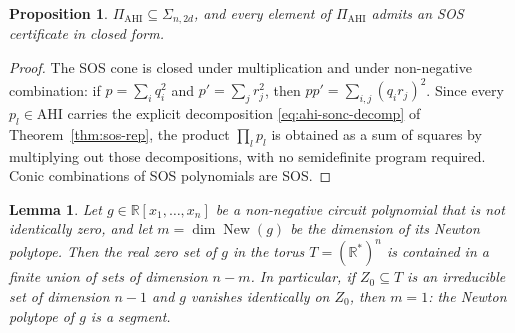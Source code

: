 \documentclass[12pt]{elsarticle}
\newtheorem{lemma}[theorem]{Lemma}
\newtheorem{proposition}[theorem]{Proposition}
\theoremstyle{definition}
\newcommand{\AHI}{\mathrm{AHI}}
\newcommand{\PiAHI}{\Pi_{\AHI}}
\begin{document}
\begin{proposition}\label{prop:pi-sos}
$\PiAHI \subseteq \Sigma_{n,2d}$, and every element of $\PiAHI$ admits an SOS certificate in closed form.
\end{proposition}

\begin{proof}
The SOS cone is closed under multiplication and under non-negative combination: if $p=\sum_i q_i^2$ and $p'=\sum_j r_j^2$, then $pp' = \sum_{i,j}(q_i r_j)^2$. Since every $p_l\in\AHI$ carries the explicit decomposition \eqref{eq:ahi-sonc-decomp} of Theorem~\ref{thm:sos-rep}, the product $\prod_l p_l$ is obtained as a sum of squares by multiplying out those decompositions, with no semidefinite program required. Conic combinations of SOS polynomials are SOS.
\end{proof}

\begin{lemma}\label{lem:circuit-zero-dim}
Let $g\in\mathbb{R}[x_1,\dots,x_n]$ be a non-negative circuit polynomial that is not identically zero, and let $m=\dim\operatorname{New}(g)$ be the dimension of its Newton polytope. Then the real zero set of $g$ in the torus $T=(\mathbb{R}^{*})^{n}$ is contained in a finite union of sets of dimension $n-m$. In particular, if $Z_{0}\subseteq T$ is an irreducible set of dimension $n-1$ and $g$ vanishes identically on $Z_{0}$, then $m=1$: the Newton polytope of $g$ is a segment.
\end{lemma}
 
\end{document}
